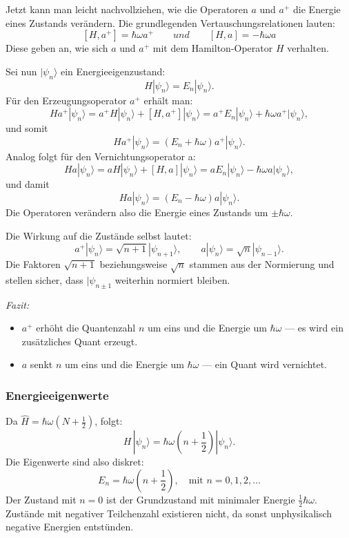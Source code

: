 			Jetzt kann man leicht nachvollziehen, wie die Operatoren $a$ und $a^+$ die Energie eines Zustands verändern.
			Die grundlegenden Vertauschungsrelationen lauten:
			\[
				[H, a^+] = \hbar\omega a^+
				\qquad
				und
				\qquad
				[H, a] = -\hbar\omega a
			\]
			Diese geben an, wie sich $a$ und $a^+$ mit dem Hamilton-Operator $H$ verhalten.

			Sei nun $|\psi_n\rangle$ ein Energieeigenzustand:
			\[
				H|\psi_n\rangle = E_n|\psi_n\rangle.
			\]
			Für den Erzeugungsoperator $a^+$ erhält man:
			\[
				H a^+|\psi_n\rangle = a^+ H|\psi_n\rangle + [H, a^+]|\psi_n\rangle = a^+ E_n|\psi_n\rangle + \hbar\omega a^+|\psi_n\rangle,
			\]
			und somit
			\begin{equation}
				H a^+|\psi_n\rangle = (E_n + \hbar\omega)a^+|\psi_n\rangle.	
			\end{equation}
			Analog folgt für den Vernichtungsoperator a:
			\[
				H a |\psi_n\rangle = a H|\psi_n\rangle + [H, a]|\psi_n\rangle = a E_n|\psi_n\rangle - \hbar\omega a|\psi_n\rangle,
			\]
			und damit
			\begin{equation}
				H a |\psi_n\rangle = (E_n - \hbar\omega)a|\psi_n\rangle.
			\end{equation}
			Die Operatoren verändern also die Energie eines Zustands um $\pm\hbar\omega$.

			Die Wirkung auf die Zustände selbst lautet:
			\begin{equation}
				a^+|\psi_n\rangle = \sqrt{n+1}|\psi_{n+1}\rangle, \qquad a|\psi_n\rangle = \sqrt{n}|\psi_{n-1}\rangle.
			\end{equation}
			Die Faktoren $\sqrt{n+1}$ beziehungsweise $\sqrt{n}$ stammen aus der Normierung und stellen sicher, dass $|\psi_{n\pm 1}$ weiterhin normiert bleiben.

			\emph{Fazit:}
			\begin{itemize}
				\item $a^+$ erhöht die Quantenzahl $n$ um eins und die Energie um $\hbar\omega$ ---
				es wird ein zusätzliches Quant erzeugt.
				\item $a$ senkt $n$ um eins und die Energie um $\hbar\omega$ ---
				ein Quant wird vernichtet.
			\end{itemize}

		\subsubsection{Energieeigenwerte\label{fourier:subsubsection:Energieeigenwerte}}
			Da $\hat{H} = \hbar\omega(N + \frac{1}{2})$, folgt:
			\begin{equation}
				H\,|\psi_n\rangle = \hbar\omega\left(n + \frac{1}{2}\right) |\psi_n\rangle.
			\end{equation}
			Die Eigenwerte sind also diskret:
			\[
				E_n = \hbar\omega\left(n + \frac{1}{2}\right), \quad \text{mit } n = 0,1,2,\dots
			\]
			Der Zustand mit $n = 0$ ist der Grundzustand mit minimaler Energie $\frac{1}{2}\hbar\omega$.
			Zustände mit negativer Teilchenzahl existieren nicht, da sonst unphysikalisch negative Energien entstünden.

